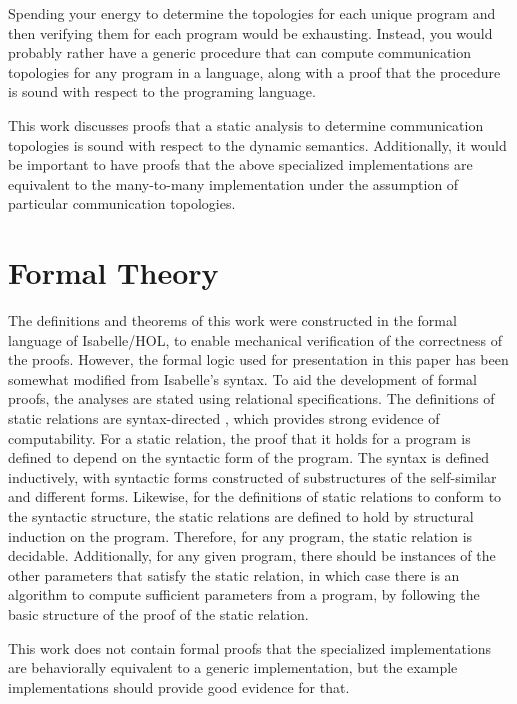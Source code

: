 \documentclass[10pt]{article}
\begin{document}
Spending your energy to determine the topologies for each unique program and then verifying
them for each program would be exhausting. Instead, you would probably rather have a generic
procedure that can compute communication topologies for any program in a language, along with
a proof that the procedure is sound with respect to the programing language.

This work discusses proofs that a static analysis to determine communication topologies is
sound with respect to the dynamic semantics.
Additionally, it would be important to have proofs that the above specialized
implementations are equivalent to the many-to-many implementation under the assumption of
particular communication topologies.

\section{Formal Theory}

The definitions and theorems of this work were constructed in the formal
language of Isabelle/HOL,
to enable mechanical verification of the correctness of the proofs.
However, the formal logic used
for presentation in this paper has been somewhat modified from Isabelle's syntax. 
To aid the development of formal proofs,
the analyses are stated using relational specifications.
The definitions of static relations are syntax-directed \cite{}, which provides
strong evidence of computability.
For a static relation, the proof that it holds for a program is defined
to depend on the syntactic form of the program.
The syntax is defined inductively, with syntactic forms constructed of 
substructures of the self-similar and different forms.   
Likewise, for the definitions of static relations to conform to the
syntactic structure, the static relations are defined to hold
by structural induction on the program.
Therefore, for any program, the static relation is decidable.
Additionally, for any given program, there should be instances of the other
parameters that satisfy the static relation, in which case there is an
algorithm to compute sufficient parameters from a program,
by following the basic structure of the proof of the static relation.

This work does not contain formal proofs that the specialized implementations are
behaviorally equivalent to a generic implementation, but the example implementations
should provide good evidence for that.
\end{document}
